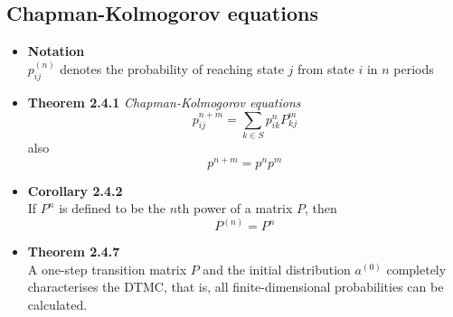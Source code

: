 \documentclass[11pt,a4paper]{article}
\begin{document}
\subsection{Chapman-Kolmogorov equations}
\begin{itemize}
	\item \textbf{Notation} \\
		$p_{ij}^{(n)}$ denotes the probability of reaching state $j$ from state $i$ in $n$ periods
	\item \textbf{Theorem 2.4.1} \emph{Chapman-Kolmogorov equations}\\
	$$p_{ij}^{n+m} = \sum_{k\in S} p_{ik}^nP_{kj}^m$$
	also
	$$p^{n+m} = p^np^m$$
\item \textbf{Corollary 2.4.2} \\
	If $P^n$ is defined to be the $n$th power of a matrix $P$, then $$P^{(n)} = P^n$$
\item \textbf{Theorem 2.4.7} \\
	A one-step transition matrix $P$ and the initial distribution $a^{(0)}$ completely characterises the DTMC, that is, all finite-dimensional probabilities can be calculated.
\end{itemize}
\end{document}
